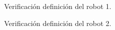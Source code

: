 \documentclass[a4paper,12pt]{article}
\begin{document}
\begin{figure}[H]
    \centering
    \begin{adjustbox}{scale = 0.5, max width=\columnwidth}
    \end{adjustbox}
    \caption{Verificación definición del robot 1.}
\end{figure}

\begin{figure}[H]
    \centering
    \begin{adjustbox}{scale = 0.45, max width=\columnwidth}
    \end{adjustbox}
    \caption{Verificación definición del robot 2.}
\end{figure}
\end{document}
